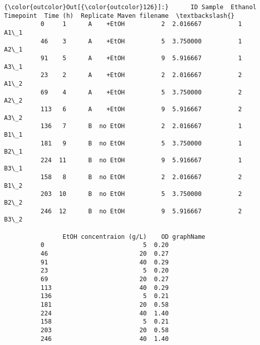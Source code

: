 \documentclass[11pt]{article}
\begin{document}
\begin{Verbatim}[commandchars=\\\{\}]
{\color{outcolor}Out[{\color{outcolor}126}]:}      ID Sample  Ethanol  Timepoint  Time (h)  Replicate Maven filename  \textbackslash{}
          0     1      A    +EtOH          2  2.016667          1           A1\_1   
          46    3      A    +EtOH          5  3.750000          1           A2\_1   
          91    5      A    +EtOH          9  5.916667          1           A3\_1   
          23    2      A    +EtOH          2  2.016667          2           A1\_2   
          69    4      A    +EtOH          5  3.750000          2           A2\_2   
          113   6      A    +EtOH          9  5.916667          2           A3\_2   
          136   7      B  no EtOH          2  2.016667          1           B1\_1   
          181   9      B  no EtOH          5  3.750000          1           B2\_1   
          224  11      B  no EtOH          9  5.916667          1           B3\_1   
          158   8      B  no EtOH          2  2.016667          2           B1\_2   
          203  10      B  no EtOH          5  3.750000          2           B2\_2   
          246  12      B  no EtOH          9  5.916667          2           B3\_2   
          
                EtOH concentraion (g/L)    OD graphName  
          0                           5  0.20            
          46                         20  0.27            
          91                         40  0.29            
          23                          5  0.20            
          69                         20  0.27            
          113                        40  0.29            
          136                         5  0.21            
          181                        20  0.58            
          224                        40  1.40            
          158                         5  0.21            
          203                        20  0.58            
          246                        40  1.40            
\end{Verbatim}
            
\end{document}

